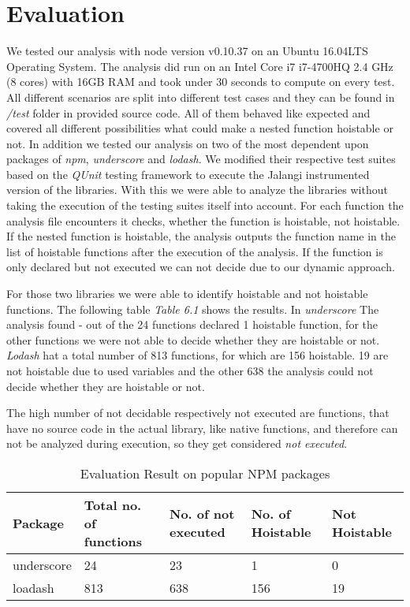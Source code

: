 \documentclass[accentcolor=tud0b,12pt,paper=a4]{tudreport}
\begin{document}
\chapter{Evaluation}
We tested our analysis with node version v0.10.37 on an Ubuntu 16.04LTS Operating System. The analysis did run on an Intel Core i7 i7-4700HQ 2.4 GHz (8 cores) with 16GB RAM and took under 30 seconds to compute on every test. 
\newline All different scenarios are split into different test cases and they can be found in \emph{/test} folder in provided source code. All of them behaved like expected and covered all different possibilities what could make a nested function hoistable or
not. In addition we tested our analysis on two of the most dependent upon packages of \emph{npm}, \emph{underscore} and \emph{lodash}.
\newline We modified their respective test suites based on the \emph{QUnit} testing framework to execute the Jalangi instrumented version of the libraries. With this we were able to analyze the libraries without taking the execution of the testing suites itself into account. For each function the analysis file encounters it checks, whether the function is hoistable, not hoistable. If the nested function is hoistable, the analysis outputs the function name in the list of hoistable functions after the execution of the analysis. If the function is only declared but not executed we can not decide due to our dynamic approach.


For those two libraries we were able to identify hoistable and not hoistable functions. The following table \emph{Table 6.1} shows the results. In \emph{underscore} The analysis found - out of the 24 functions declared 1 hoistable function, for the other functions we were not able to decide whether they are hoistable or not. \emph{Lodash} hat a total number of
813 functions, for which are 156 hoistable. 19 are not hoistable due to used variables and the other 638 the analysis could not decide whether they are hoistable or not.

The high number of not decidable respectively not executed are functions, that have no source code in the actual library, like native functions, and therefore can not be analyzed during execution, so they get considered \emph{not executed}.
\begin{table}[]
	\centering
	\label{my-label}
	\begin{tabular}{lllll}
	\hline
		Package    & Total no. of functions & No. of not executed & No. of Hoistable & Not Hoistable \\ \hline
		underscore & 24                     & 23                  & 1                & 0                   \\ \hline
		loadash    & 813                    & 638                 & 156              & 19 \\ \hline                 
	\end{tabular}
	\caption{Evaluation Result on popular NPM packages}
\end{table}
\end{document}
